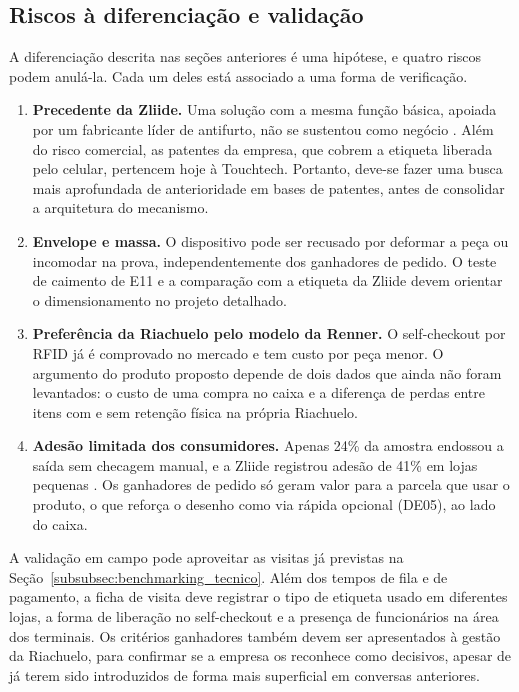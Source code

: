 \subsection{Riscos à diferenciação e validação}
\label{sec:riscos-diferenciacao}

A diferenciação descrita nas seções anteriores é uma hipótese, e quatro riscos podem anulá-la. Cada um deles está associado a uma forma de verificação.

\begin{enumerate}[label=\alph*)]
  \item \textbf{Precedente da Zliide.} Uma solução com a mesma função básica, apoiada por um fabricante líder de antifurto, não se sustentou como negócio \cite{touchtech2025}. Além do risco comercial, as patentes da empresa, que cobrem a etiqueta liberada pelo celular, pertencem hoje à Touchtech. Portanto, deve-se fazer uma busca mais aprofundada de anterioridade em bases de patentes, antes de consolidar a arquitetura do mecanismo.

  \item \textbf{Envelope e massa.} O dispositivo pode ser recusado por deformar a peça ou incomodar na prova, independentemente dos ganhadores de pedido. O teste de caimento de E11 e a comparação com a etiqueta da Zliide devem orientar o dimensionamento no projeto detalhado.

  \item \textbf{Preferência da Riachuelo pelo modelo da Renner.} O self-checkout por RFID já é comprovado no mercado e tem custo por peça menor. O argumento do produto proposto depende de dois dados que ainda não foram levantados: o custo de uma compra no caixa e a diferença de perdas entre itens com e sem retenção física na própria Riachuelo.

  \item \textbf{Adesão limitada dos consumidores.} Apenas 24\% da amostra endossou a saída sem checagem manual, e a Zliide registrou adesão de 41\% em lojas pequenas \cite{swedberg2021}. Os ganhadores de pedido só geram valor para a parcela que usar o produto, o que reforça o desenho como via rápida opcional (DE05), ao lado do caixa.
\end{enumerate}

A validação em campo pode aproveitar as visitas já previstas na Seção~\ref{subsubsec:benchmarking_tecnico}. Além dos tempos de fila e de pagamento, a ficha de visita deve registrar o tipo de etiqueta usado em diferentes lojas, a forma de liberação no self-checkout e a presença de funcionários na área dos terminais. Os critérios ganhadores também devem ser apresentados à gestão da Riachuelo, para confirmar se a empresa os reconhece como decisivos, apesar de já terem sido introduzidos de forma mais superficial em conversas anteriores.
